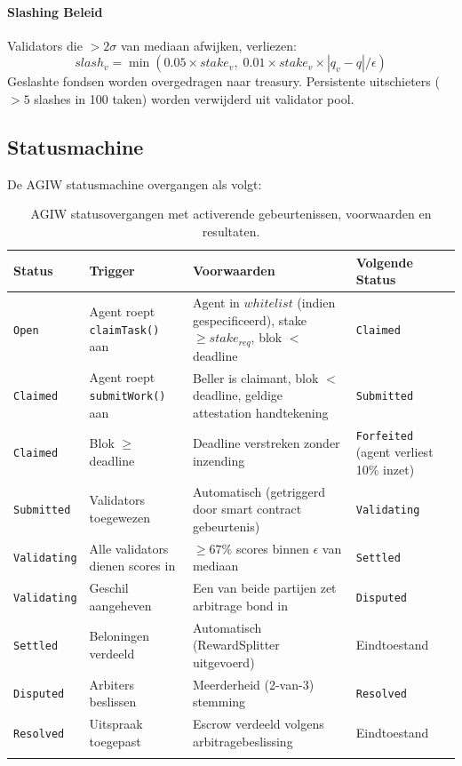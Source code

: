 \documentclass[11pt]{article}
\begin{document}
\paragraph{Slashing Beleid} Validators die $>2\sigma$ van mediaan afwijken, verliezen:
\begin{equation}
slash_v = \min(0.05 \times stake_v, \; 0.01 \times stake_v \times |q_v - q| / \epsilon)
\end{equation}
Geslashte fondsen worden overgedragen naar treasury. Persistente uitschieters ($>5$ slashes in 100 taken) worden verwijderd uit validator pool.

\subsection{Statusmachine}
\label{sec:agiw-state-machine}
De AGIW statusmachine overgangen als volgt:
\begin{longtable}{@{}p{}p{}p{}p{}@{}}
\toprule
\textbf{Status} & \textbf{Trigger} & \textbf{Voorwaarden} & \textbf{Volgende Status} \\\midrule
\texttt{Open} & Agent roept \texttt{claimTask()} aan & Agent in $whitelist$ (indien gespecificeerd), stake $\geq stake_{req}$, blok $<$ deadline & \texttt{Claimed} \\
\texttt{Claimed} & Agent roept \texttt{submitWork()} aan & Beller is claimant, blok $<$ deadline, geldige attestation handtekening & \texttt{Submitted} \\
\texttt{Claimed} & Blok $\geq$ deadline & Deadline verstreken zonder inzending & \texttt{Forfeited} (agent verliest 10\% inzet) \\
\texttt{Submitted} & Validators toegewezen & Automatisch (getriggerd door smart contract gebeurtenis) & \texttt{Validating} \\
\texttt{Validating} & Alle validators dienen scores in & $\geq 67\%$ scores binnen $\epsilon$ van mediaan & \texttt{Settled} \\
\texttt{Validating} & Geschil aangeheven & Een van beide partijen zet arbitrage bond in & \texttt{Disputed} \\
\texttt{Settled} & Beloningen verdeeld & Automatisch (RewardSplitter uitgevoerd) & Eindtoestand \\
\texttt{Disputed} & Arbiters beslissen & Meerderheid (2-van-3) stemming & \texttt{Resolved} \\
\texttt{Resolved} & Uitspraak toegepast & Escrow verdeeld volgens arbitragebeslissing & Eindtoestand \\\bottomrule
\caption{AGIW statusovergangen met activerende gebeurtenissen, voorwaarden en resultaten.}
\label{tab:agiw-states}
\end{longtable}
\end{document}
